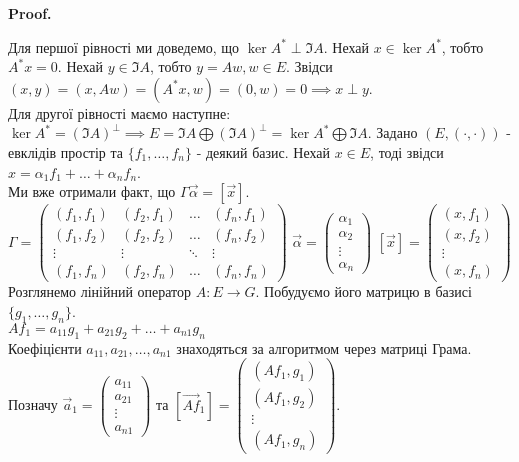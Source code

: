 \documentclass[a4paper, 10pt]{article}
\makeatletter
\theoremstyle{theoremdd}
\renewenvironment{proof}[1][Proof.\\]{\par
\pushQED{\hfill \qed}%
\normalfont \topsep6\p@\@plus6\p@\relax
\trivlist
\item\relax
{\bfseries
#1\@addpunct{.}}\hspace\labelsep\ignorespaces
}{%
\popQED\endtrivlist\@endpefalse
}
\makeatother
\begin{document}
\begin{proof}
Для першої рівності ми доведемо, що $\ker A^* \perp \Im A$. Нехай $x \in \ker A^*$, тобто $A^*x = 0$. Нехай $y \in \Im A$, тобто $y = Aw,w \in E$. Звідси\\
$(x,y) = (x, Aw) = (A^*x, w) = (0, w) = 0 \implies x \perp y$. \\
Для другої рівності маємо наступне:\\
$\ker A^* = (\Im A)^{\perp} \implies E = \Im A \bigoplus (\Im A)^{\perp} = \ker A^* \bigoplus \Im A$.
\end{proof}
\noindent
Задано $(E,(\cdot,\cdot))$ - евклідів простір та $\{f_1,\dots,f_n\}$ - деякий базис. Нехай $x \in E$, тоді звідси $x = \alpha_1 f_1 + \dots + \alpha_n f_n$.\\
Ми вже отримали факт, що $\Gamma \vec{\alpha} = [\vec{x}]$.\\
$\Gamma = \begin{pmatrix}
(f_1,f_1) & (f_2,f_1) & \dots & (f_n,f_1) \\
(f_1,f_2) & (f_2,f_2) & \dots & (f_n,f_2) \\
\vdots & \vdots & \ddots & \vdots \\
(f_1,f_n) & (f_2,f_n) & \dots & (f_n,f_n)
\end{pmatrix}$ \hspace{1cm}
$\vec{\alpha} = \begin{pmatrix}
\alpha_1 \\ \alpha_2 \\ \vdots \\ \alpha_n
\end{pmatrix}$ \hspace{1cm}
$[\vec{x}] = \begin{pmatrix}
(x,f_1) \\ (x,f_2) \\ \vdots \\ (x,f_n)
\end{pmatrix}$
\\
Розглянемо лінійний оператор $A \colon E \to G$. Побудуємо його матрицю в базисі $\{g_1,\dots,g_n\}$.\\
$Af_1 = a_{11}g_1 + a_{21}g_2 + \dots + a_{n1}g_n$\\
Коефіцієнти $a_{11},a_{21},\dots,a_{n1}$ знаходяться за алгоритмом через матриці Грама.\\
Позначу $\vec{a}_1 = \begin{pmatrix}
a_{11} \\ a_{21} \\ \vdots \\ a_{n1}
\end{pmatrix}$ та $[\overrightarrow{Af}_1] = \begin{pmatrix}
(Af_1,g_1) \\ (Af_1,g_2) \\ \vdots \\ (Af_1,g_n)
\end{pmatrix}$.\\
\end{document}
